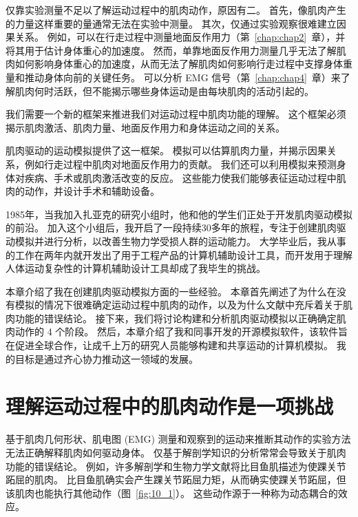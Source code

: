 仅靠实验测量不足以了解运动过程中的肌肉动作，原因有二。
首先，像肌肉产生的力量这样重要的量通常无法在实验中测量。
其次，仅通过实验观察很难建立因果关系。
例如，可以在行走过程中测量地面反作用力（第~\ref{chap:chap2}~章），并将其用于估计身体重心的加速度。
然而，单靠地面反作用力测量几乎无法了解肌肉如何影响身体重心的加速度，从而无法了解肌肉如何影响行走过程中支撑身体重量和推动身体向前的关键任务。
可以分析 EMG 信号（第~\ref{chap:chap4}~章）来了解肌肉何时活跃，但不能揭示哪些身体运动是由每块肌肉的活动引起的。


我们需要一个新的框架来推进我们对运动过程中肌肉功能的理解。
这个框架必须揭示肌肉激活、肌肉力量、地面反作用力和身体运动之间的关系。


肌肉驱动的运动模拟提供了这一框架。
模拟可以估算肌肉力量，并揭示因果关系，例如行走过程中肌肉对地面反作用力的贡献。
我们还可以利用模拟来预测身体对疾病、手术或肌肉激活改变的反应。
这些能力使我们能够表征运动过程中肌肉的动作，并设计手术和辅助设备。


1985年，当我加入扎亚克的研究小组时，他和他的学生们正处于开发肌肉驱动模拟的前沿。
加入这个小组后，我开启了一段持续30多年的旅程，专注于创建肌肉驱动模拟并进行分析，以改善生物力学受损人群的运动能力。
大学毕业后，我从事的工作在两年内就开发出了用于工程产品的计算机辅助设计工具，而开发用于理解人体运动复杂性的计算机辅助设计工具却成了我毕生的挑战。


本章介绍了我在创建肌肉驱动模拟方面的一些经验。
本章首先阐述了为什么在没有模拟的情况下很难确定运动过程中肌肉的动作，以及为什么文献中充斥着关于肌肉功能的错误结论。
接下来，我们将讨论构建和分析肌肉驱动模拟以正确确定肌肉动作的 4 个阶段。
然后，本章介绍了我和同事开发的开源模拟软件，该软件旨在促进全球合作，让成千上万的研究人员能够构建和共享运动的计算机模拟。
我的目标是通过齐心协力推动这一领域的发展。


\section{理解运动过程中的肌肉动作是一项挑战}

基于肌肉几何形状、肌电图 (EMG) 测量和观察到的运动来推断其动作的实验方法无法正确解释肌肉如何驱动身体。
仅基于解剖学知识的分析常常会导致关于肌肉功能的错误结论。
例如，许多解剖学和生物力学文献将比目鱼肌描述为使踝关节跖屈的肌肉。
比目鱼肌确实会产生踝关节跖屈力矩，从而确实使踝关节跖屈，但该肌肉也能执行其他动作（图~\ref{fig:10_1}）。
这些动作源于一种称为动态耦合的效应。

